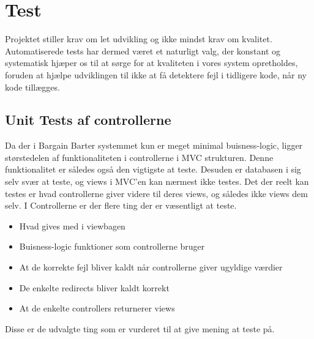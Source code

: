 \chapter{Test}

Projektet stiller krav om let udvikling og ikke mindst krav om kvalitet. Automatiserede tests har dermed været et naturligt valg, der konstant og systematisk hjæper os til at sørge for at kvaliteten i vores system opretholdes, foruden at hjælpe udviklingen til ikke at få detektere fejl i tidligere kode, når ny kode tillægges.



\section{Unit Tests af controllerne}
Da der i Bargain Barter systemmet kun er meget minimal buisness-logic, ligger størstedelen af funktionaliteten i controllerne i MVC strukturen. Denne funktionalitet er således også den vigtigste at teste. Desuden er databasen i sig selv svær at teste, og views i MVC'en kan nærmest ikke testes. Det der reelt kan testes er hvad controllerne giver videre til deres views, og således ikke views dem selv. I Controllerne er der flere ting der er væsentligt at teste.
\begin{itemize}
	\item Hvad gives med i viewbagen
	\item Buisness-logic funktioner som controllerne bruger
	\item At de korrekte fejl bliver kaldt når controllerne giver ugyldige værdier
	\item De enkelte redirects bliver kaldt korrekt
	\item At de enkelte controllers returnerer views
\end{itemize}       
Disse er de udvalgte ting som er vurderet til at give mening at teste på.

